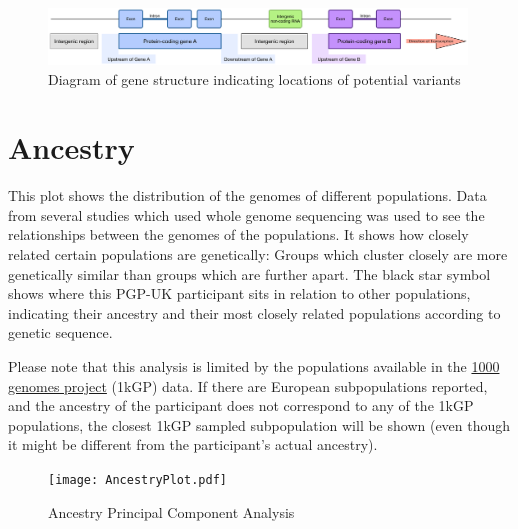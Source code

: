 \documentclass{article}
\begin{document}
\begin{figure}[H]
\begin{centering}
\includegraphics[width=0.99\textwidth]{GeneStructure.pdf}
\par\end{centering}

\caption{Diagram of gene structure indicating locations of potential variants}
\end{figure}


\pagebreak

\section{Ancestry}

This plot shows the distribution of the genomes of different populations. Data from several studies which used whole genome sequencing was used to see the relationships between the genomes of the populations. It shows how closely related certain populations are genetically: Groups which cluster closely are more genetically similar than groups which are further apart. The black star symbol shows where this PGP-UK participant sits in relation to other populations, indicating their ancestry and their most closely related populations according to genetic sequence.
\par
Please note that this analysis is limited by the populations available in the  \href{http://www.internationalgenome.org/category/population/}{1000 genomes project} (1kGP) data. If there are European subpopulations reported, and the ancestry of the participant does not correspond to any of the 1kGP populations, the closest 1kGP sampled subpopulation will be shown (even though it might be different from the participant's actual ancestry).


\vspace{15 mm}


\begin{figure}[H]
\begin{centering}
\texttt{[image: AncestryPlot.pdf]}
\par\end{centering}

\caption{Ancestry Principal Component Analysis}
\end{figure}
\end{document}
